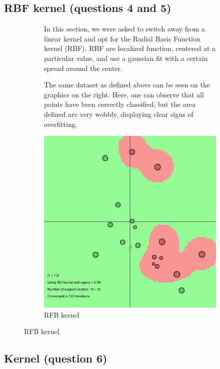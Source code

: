 \documentclass[11pt, a4paper]{article}
\begin{document}
\subsection{RBF kernel (questions 4 and 5)}

\begin{figure}[H]
    \centering
    \begin{subfigure}[b]{.5\textwidth}
      In this section, we were asked to switch away from a linear kernel and
      opt for the Radial Basis Function kernel (RBF). RBF are localized
      function, centered at a particular value, and use a gaussian fit with
      a certain spread around the center. 

      The same dataset as defined above can be seen on the graphics on
      the right. Here, one can observe that all points have been
      correctly classified, but the area defined are very wobbly,
      displaying clear signs of overfitting.
    \end{subfigure}%
    \begin{subfigure}{.5\textwidth}
      \vspace{-65pt}
      \centering
      \includegraphics[width=0.9\linewidth]{1-2-1-kernel.png}
      \caption{RFB kernel}
      \label{fig:lin4}
    \end{subfigure}
\end{figure}

\subsection{Kernel (question 6)}
\end{document}
